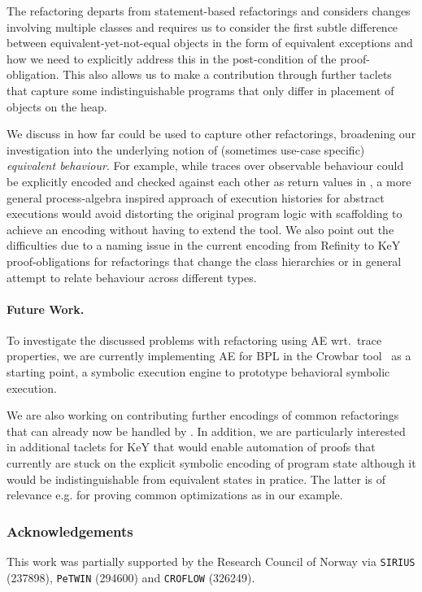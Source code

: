 \documentclass[runningheads]{llncs}
\begin{document}
The  refactoring departs from statement-based refactorings and considers changes involving multiple classes and requires us to consider the first subtle difference between equivalent-yet-not-equal objects in the form of equivalent exceptions and how we need to explicitly address this in the post-condition of the proof-obligation.
This also allows us to make a contribution through further taclets that capture some indistinguishable programs that only differ in placement of objects on the heap.

We discuss in how far \Refinity{} could be used to capture other refactorings, broadening our investigation into the underlying notion of (sometimes use-case specific) \textit{equivalent behaviour}.
For example, while traces over observable behaviour could be explicitly encoded and checked against each other as return values in \Refinity{}, a more general process-algebra inspired approach of execution histories for abstract executions would avoid distorting the original program logic with scaffolding to achieve an encoding without having to extend the tool.
We also point out the difficulties due to a naming issue in the current encoding from Refinity to KeY proof-obligations for refactorings that change the class hierarchies or in general attempt to relate behaviour across different types.

\paragraph{Future Work.} 
To investigate the discussed problems with refactoring using AE wrt.\ trace properties, we are currently implementing AE for BPL in the Crowbar tool~\cite{crowbar} as a starting point, a symbolic execution engine to prototype behavioral symbolic execution.

We are also working on contributing further encodings of common refactorings that can already now be handled by \Refinity{}.
In addition, we are particularly interested in additional taclets for KeY that would enable automation of proofs
that currently are stuck on the explicit symbolic encoding of program state although it would be indistinguishable from equivalent states in pratice.
The latter is of relevance e.g. for proving common optimizations as in our  example.

\subsubsection*{Acknowledgements}
This work was partially supported by the Research Council of Norway via \texttt{SIRIUS} (237898), \texttt{PeTWIN} (294600) and \texttt{CROFLOW} (326249).
%

% 



\end{document}
